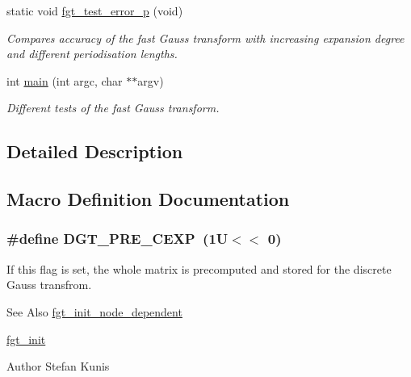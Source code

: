 \begin{DoxyCompactItemize}
static void \hyperlink{group__applications__fastgauss_ga80e78939f56d085d53a092e098b592eb}{fgt\-\_\-test\-\_\-error\-\_\-p} (void)
\begin{DoxyCompactList}\small\item\em Compares accuracy of the fast Gauss transform with increasing expansion degree and different periodisation lengths. \end{DoxyCompactList}\item 
int \hyperlink{group__applications__fastgauss_ga3c04138a5bfe5d72780bb7e82a18e627}{main} (int argc, char $\ast$$\ast$argv)
\begin{DoxyCompactList}\small\item\em Different tests of the fast Gauss transform. \end{DoxyCompactList}\end{DoxyCompactItemize}


\subsection{Detailed Description}


\subsection{Macro Definition Documentation}
\hypertarget{group__applications__fastgauss_ga48aa1ec81a29b9f079701246f0b53ccc}{
\subsubsection[{D\-G\-T\-\_\-\-P\-R\-E\-\_\-\-C\-E\-X\-P}]{\setlength{\rightskip}{0pt plus 5cm}\#define D\-G\-T\-\_\-\-P\-R\-E\-\_\-\-C\-E\-X\-P~(1\-U$<$$<$ 0)}}\label{group__applications__fastgauss_ga48aa1ec81a29b9f079701246f0b53ccc}


If this flag is set, the whole matrix is precomputed and stored for the discrete Gauss transfrom. 

\begin{DoxySeeAlso}{See Also}
\hyperlink{group__applications__fastgauss_gadabf8e2765e840b32543b5a0f4d8aa62}{fgt\-\_\-init\-\_\-node\-\_\-dependent} 

\hyperlink{group__applications__fastgauss_gafe5ae1b90fe2f98495f5c7df70fdcdc8}{fgt\-\_\-init} 
\end{DoxySeeAlso}
\begin{DoxyAuthor}{Author}
Stefan Kunis 
\end{DoxyAuthor}


